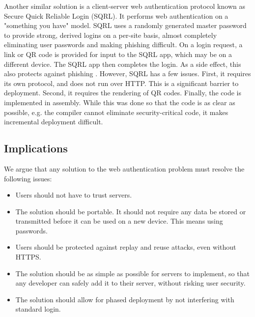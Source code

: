 Another similar solution is a client-server web authentication protocol known as Secure Quick Reliable Login (SQRL). It performs web authentication on a "something you have" model. SQRL uses a randomly generated master password to provide strong, derived logins on a per-site basis, almost completely eliminating user passwords and making phishing difficult. On a login request, a link or QR code is provided for input to the SQRL app, which may be on a different device. The SQRL app then completes the login. As a side effect, this also protects against phishing \cite{Gibson:2016}. However, SQRL has a few issues. First, it requires its own protocol, and does not run over HTTP. This is a significant barrier to deployment. Second, it requires the rendering of QR codes. Finally, the code is implemented in assembly. While this was done so that the code is as clear as possible, e.g. the compiler cannot eliminate security-critical code, it makes incremental deployment difficult.

\subsection{Implications}
We argue that any solution to the web authentication problem must resolve the following issues:

\begin{itemize}

    \item Users should not have to trust servers.

    \item The solution should be portable. It should not require any data be stored or transmitted before it can be used on a new device. This means using passwords.

    \item Users should be protected against replay and reuse attacks, even without HTTPS.

    \item The solution should be as simple as possible for servers to implement, so that any developer can safely add it to their server, without risking user security.

    \item The solution should allow for phased deployment by not interfering with standard login.

\end{itemize}
